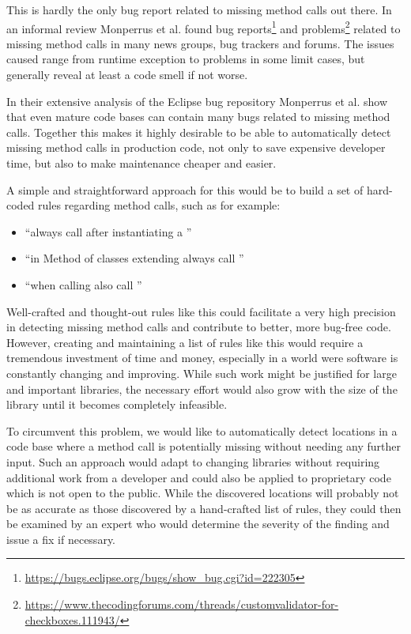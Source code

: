 This is hardly the only bug report related to missing method calls out there.
In an informal review Monperrus et al. found bug reports\footnote{\url{https://bugs.eclipse.org/bugs/show_bug.cgi?id=222305}} and problems\footnote{\url{https://www.thecodingforums.com/threads/customvalidator-for-checkboxes.111943/}} related to missing method calls in many news groups, bug trackers and forums.
The issues caused range from runtime exception to problems in some limit cases, but generally reveal at least a code smell if not worse.

In their extensive analysis of the Eclipse bug repository Monperrus et al. \cite{monperrus2013detecting} show that even mature code bases can contain many bugs related to missing method calls.
Together this makes it highly desirable to be able to automatically detect missing method calls in production code, not only to save expensive developer time, but also to make maintenance cheaper and easier.

A simple and straightforward approach for this would be to build a set of hard-coded rules regarding method calls, such as for example:
\begin{itemize}
    \item ``always call  after instantiating a ''
    \item ``in Method  of classes extending  always call ''
    \item ``when calling  also call ''
\end{itemize}
Well-crafted and thought-out rules like this could facilitate a very high precision in detecting missing method calls and contribute to better, more bug-free code.
However, creating and maintaining a list of rules like this would require a tremendous investment of time and money, especially in a world were software is constantly changing and improving.
While such work might be justified for large and important libraries, the necessary effort would also grow with the size of the library until it becomes completely infeasible.

To circumvent this problem, we would like to automatically detect locations in a code base where a method call is potentially missing without needing any further input.
Such an approach would adapt to changing libraries without requiring additional work from a developer and could also be applied to proprietary code which is not open to the public.
While the discovered locations will probably not be as accurate as those discovered by a hand-crafted list of rules, they could then be examined by an expert who would determine the severity of the finding and issue a fix if necessary.

